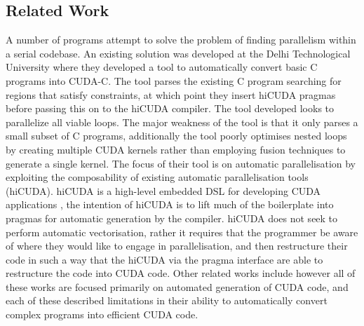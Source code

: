\subsection{Related Work}
A number of programs attempt to solve the problem of finding parallelism within a serial codebase.
An existing solution was developed at the Delhi Technological University\cite{jindal2012automated}
where they developed a tool to automatically convert basic C programs into CUDA-C. The tool parses
the existing C program searching for regions that satisfy constraints, at which point they insert
hiCUDA pragmas before passing this on to the hiCUDA compiler. The tool developed looks to
parallelize all viable loops. The major weakness of the tool is that it only parses a small subset
of C programs, additionally the tool poorly optimises nested loops by creating multiple CUDA kernels
rather than employing fusion techniques to generate a single kernel. The focus of their tool is on
automatic parallelisation by exploiting the composability of existing automatic parallelisation
tools (hiCUDA). hiCUDA is a high-level embedded DSL for developing CUDA applications
\cite{han2011hicuda}, the intention of hiCUDA is to lift much of the boilerplate into pragmas for
automatic generation by the compiler. hiCUDA does not seek to perform automatic vectorisation,
rather it requires that the programmer be aware of where they would like to engage in
parallelisation, and then restructure their code in such a way that the hiCUDA via the pragma
interface are able to restructure the code into CUDA code. Other related works include
\cite{baskaran2010automatic}\cite{yan2009jcuda}\cite{verdoolaege2013polyhedral} however all of these
works are focused primarily on automated generation of CUDA code, and each of these described
limitations in their ability to automatically convert complex programs into efficient CUDA code.
 

